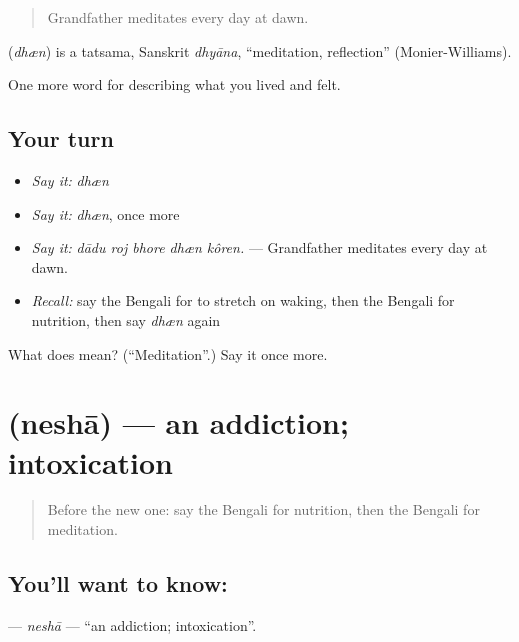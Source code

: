 \begin{quote}
Grandfather meditates every day at dawn.
\end{quote}

\begin{cousinweb}
\textbf{} (\emph{dhæn}) is a tatsama, Sanskrit \emph{dhyāna}, \textquotedblleft{}meditation, reflection\textquotedblright{} (Monier-Williams).
\end{cousinweb}

\begin{grammarlens}[title={What you've built}]
One more word for describing what you lived and felt.
\end{grammarlens}

\subsection*{Your turn}
\begin{itemize}
\raggedright
  \item \emph{Say it:} \emph{dhæn}
  \item \emph{Say it:} \emph{dhæn}, once more
  \item \emph{Say it:} \emph{dādu roj bhore dhæn kôren.} — Grandfather meditates every day at dawn.
  \item \emph{Recall:} say the Bengali for to stretch on waking, then the Bengali for nutrition, then say \emph{dhæn} again
\end{itemize}

\begin{tcolorbox}[breakable,colback=teal!4,colframe=teal!35!black,title={Before you move on}]
What does  mean? (\textquotedblleft{}Meditation\textquotedblright{}.) Say it once more.
\end{tcolorbox}
\section[\texorpdfstring{\bn{নেশা} (neshā)}{নেশা (neshā)}]{ (neshā) — an addiction; intoxication}

\label{lesson:BN-C480-nesha}



\begin{quote}
Before the new one: say the Bengali for nutrition, then the Bengali for meditation.
\end{quote}

\subsection*{You'll want to know: }
\textbf{} — \emph{neshā} — \textquotedblleft{}an addiction; intoxication\textquotedblright{}.

